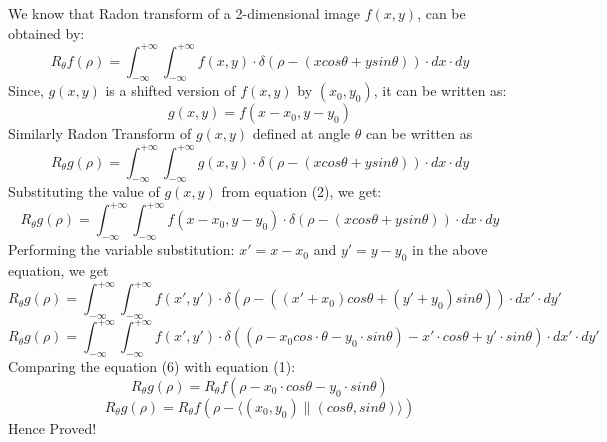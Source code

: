 \documentclass{article}
\begin{document}
\begin{enumerate}
We know that Radon transform of a 2-dimensional image $f(x, y)$, can be obtained by:
\begin{equation}    
    R_{\theta}f(\rho) = \int_{-\infty}^{+\infty} \int_{-\infty}^{+\infty} f(x,y) \cdot\delta(\rho - (x cos\theta + y sin\theta)) \cdot dx \cdot dy
\end{equation}
Since, $g(x, y)$ is a shifted version of $f(x, y)$ by $(x_0, y_0)$, it can be written as:
\begin{equation}    
    g(x, y) = f(x - x_0, y - y_0)
\end{equation}
Similarly Radon Transform of $g(x, y)$ defined at angle $\theta$ can be written as
\begin{equation}
    R_{\theta}g(\rho) = \int_{-\infty}^{+\infty} \int_{-\infty}^{+\infty} g(x,y) \cdot\delta(\rho - (x cos\theta + y sin\theta)) \cdot dx \cdot dy
\end{equation}
Substituting the value of $g(x, y)$ from equation (2), we get:
\begin{equation}
    R_{\theta}g(\rho) = \int_{-\infty}^{+\infty} \int_{-\infty}^{+\infty} f(x - x_0, y - y_0) \cdot\delta(\rho - (x cos\theta + y sin\theta)) \cdot dx \cdot dy
\end{equation}
Performing the variable substitution: $x' = x - x_0$ and $y' = y - y_0$ in the above equation, we get
\begin{equation}
    R_{\theta}g(\rho) = \int_{-\infty}^{+\infty} \int_{-\infty}^{+\infty} f(x', y') \cdot\delta(\rho - ((x' + x_0) cos\theta + (y' + y_0 )sin\theta)) \cdot dx' \cdot dy'
\end{equation}
\begin{equation}
    R_{\theta}g(\rho) = \int_{-\infty}^{+\infty} \int_{-\infty}^{+\infty} f(x', y') \cdot\delta((\rho - x_0 cos\cdot \theta -y_0 \cdot sin\theta) - x' \cdot cos\theta + y'\cdot sin\theta) \cdot dx' \cdot dy'
\end{equation}
Comparing the equation (6) with equation (1):
\[
    R_{\theta}g(\rho) = R_{\theta}f(\rho - x_0\cdot cos\theta - y_0 \cdot sin\theta)
\]
\[
    R_{\theta}g(\rho) = R_{\theta}f(\rho - \langle (x_0, y_0) \| (cos \theta, sin\theta) \rangle)
\]
Hence Proved!

\end{enumerate}
\end{document}
